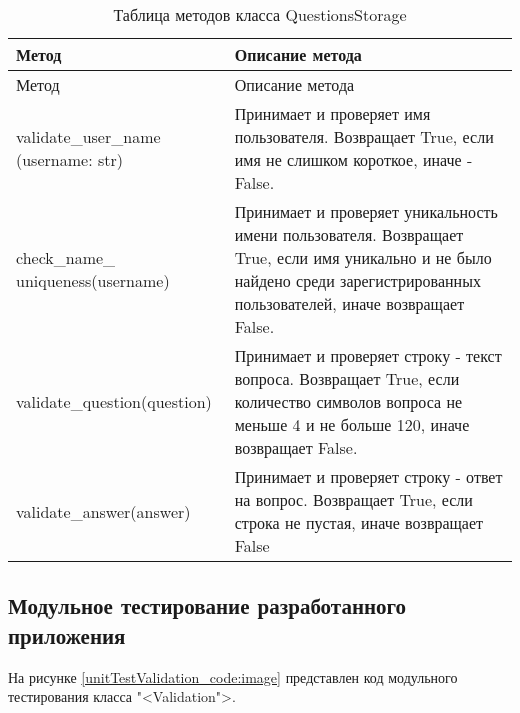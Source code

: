 \begin{xltabular}{\textwidth}{|p{6cm}|X|}
	\caption{Таблица методов класса QuestionsStorage\label{validation_functions:table}} \hline
	\centrow Метод & \centrow Описание метода \\ \hline
	\endfirsthead
	\centrow Метод & \centrow Описание метода \\ \hline
	\finishhead
	validate\_user\_name (username: str) & Принимает и проверяет имя пользователя. Возвращает True, если имя не слишком короткое, иначе - False. \\ \hline 
	check\_name\_ uniqueness(username) & Принимает и проверяет уникальность имени пользователя. Возвращает True, если имя уникально и не было найдено среди зарегистрированных пользователей, иначе возвращает False. \\ \hline
	validate\_question(question) & Принимает и проверяет строку - текст вопроса. Возвращает True, если количество символов вопроса не меньше 4 и не больше 120, иначе возвращает False. \\ \hline
	validate\_answer(answer) & Принимает и проверяет строку - ответ на вопрос. Возвращает True, если строка не пустая, иначе возвращает False
\end{xltabular}
\newpage

\subsection{Модульное тестирование разработанного приложения}

На рисунке \ref{unitTestValidation_code:image} представлен код модульного тестирования класса "<Validation">.

